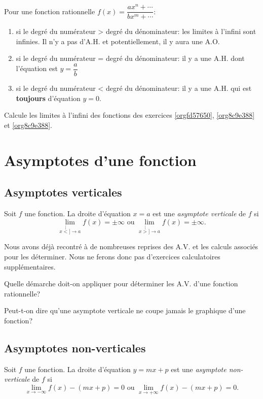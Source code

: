 \documentclass[a4paper,12pt]{report}
\newcommand{\tog}{\stackrel[<]{}{\to}}
\newcommand{\tod}{\stackrel[>]{}{\to}}
\newcommand{\pinf}{+\infty}
\newcommand{\minf}{-\infty}
\newcommand{\pminf}{\pm\infty}
\begin{document}
\begin{tcolorbox}
Pour une fonction rationnelle \(f(x)=\dfrac{ax^n+\cdots}{bx^m+\cdots}\):

\begin{enumerate}
\item si le degré du numérateur > degré du dénominateur: les limites à l'infini
sont infinies. Il n'y a pas d'A.H. et potentiellement, il y aura une A.O.
\item si le degré du numérateur = degré du dénominateur: il y a une A.H. dont
l'équation est \(y=\dfrac{a}{b}\)
\item si le degré du numérateur < degré du dénominateur: il y a une A.H. qui est
\textbf{toujours} d'équation \(y=0\).
\end{enumerate}
\end{tcolorbox}
\begin{exercice}
Calcule les limites à l'infini des fonctions des exercices \ref{orgfd57650},
\ref{org8c9e388} et \ref{org8c9e388}.
\end{exercice}


\chapter{Asymptotes d'une fonction}
\label{sec:org7aa98b0}
\section{Asymptotes verticales}
\label{sec:orga76640a}
\begin{definition}
Soit \(f\) une fonction. La droite d'équation \(x=a\) est une \emph{asymptote verticale}
de \(f\) si
\[\lim\limits_{x\tog a}f(x)=\pminf\text{ ou }\lim\limits_{x\tod a}f(x)=\pminf.\]
\end{definition}

Nous avons déjà recontré à de nombreuses reprises des A.V. et les calculs
associés pour les déterminer. Nous ne ferons donc pas d'exercices calculatoires supplémentaires.

\begin{exercice}
Quelle démarche doit-on appliquer pour déterminer les A.V. d'une fonction rationnelle?
\end{exercice}
\begin{exercice}
Peut-t-on dire qu'une asymptote verticale ne coupe jamais le graphique d'une fonction?
\end{exercice}
\section{Asymptotes non-verticales}
\label{sec:org5864870}
\begin{definition}
Soit \(f\) une fonction. La droite d'équation \(y=mx+p\) est une \emph{asymptote
non-verticale} de \(f\) si
\[
\lim\limits_{x\to\minf}f(x)-(mx+p)=0\text{ ou }\lim\limits_{x\to \pinf}f(x)-(mx+p)=0.
\]
\end{definition}
\end{document}
